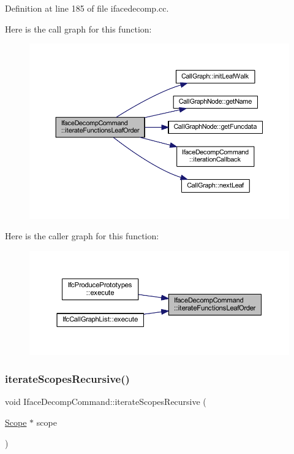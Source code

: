 Definition at line 185 of file ifacedecomp.\+cc.

Here is the call graph for this function\+:
\nopagebreak
\begin{figure}[H]
\begin{center}
\leavevmode
\includegraphics[width=350pt]{class_iface_decomp_command_a9ad8fa5ad85876f4a085822fa9f04d48_cgraph}
\end{center}
\end{figure}
Here is the caller graph for this function\+:
\nopagebreak
\begin{figure}[H]
\begin{center}
\leavevmode
\includegraphics[width=350pt]{class_iface_decomp_command_a9ad8fa5ad85876f4a085822fa9f04d48_icgraph}
\end{center}
\end{figure}
\mbox{\label{class_iface_decomp_command_a9f80fe6092ffac0f38a848eeae0b3773}} 
\subsubsection{\texorpdfstring{iterateScopesRecursive()}{iterateScopesRecursive()}}
{\footnotesize\ttfamily void Iface\+Decomp\+Command\+::iterate\+Scopes\+Recursive (\begin{DoxyParamCaption}\item[{\mbox{\hyperlink{class_scope}{Scope}} $\ast$}]{scope }\end{DoxyParamCaption})\hspace{0.3cm}{\ttfamily [protected]}}



